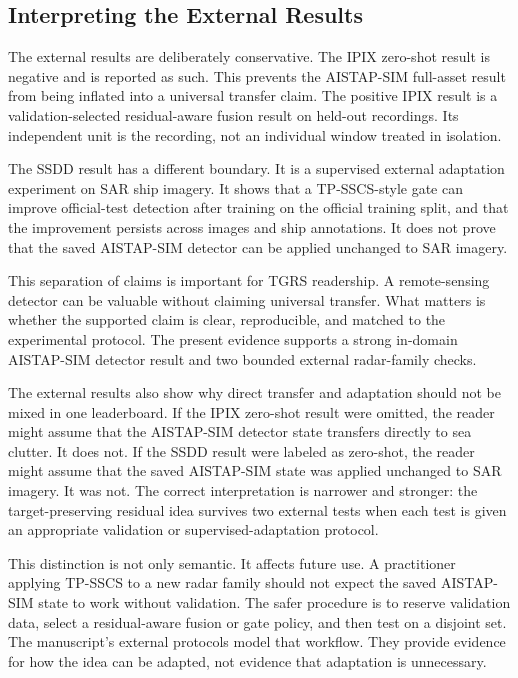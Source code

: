\documentclass[journal]{IEEEtran}
\begin{document}
\subsection{Interpreting the External Results}

The external results are deliberately conservative. The IPIX zero-shot result is negative and is reported as such. This prevents the AISTAP-SIM full-asset result from being inflated into a universal transfer claim. The positive IPIX result is a validation-selected residual-aware fusion result on held-out recordings. Its independent unit is the recording, not an individual window treated in isolation.

The SSDD result has a different boundary. It is a supervised external adaptation experiment on SAR ship imagery. It shows that a TP-SSCS-style gate can improve official-test detection after training on the official training split, and that the improvement persists across images and ship annotations. It does not prove that the saved AISTAP-SIM detector can be applied unchanged to SAR imagery.

This separation of claims is important for TGRS readership. A remote-sensing detector can be valuable without claiming universal transfer. What matters is whether the supported claim is clear, reproducible, and matched to the experimental protocol. The present evidence supports a strong in-domain AISTAP-SIM detector result and two bounded external radar-family checks.

The external results also show why direct transfer and adaptation should not be mixed in one leaderboard. If the IPIX zero-shot result were omitted, the reader might assume that the AISTAP-SIM detector state transfers directly to sea clutter. It does not. If the SSDD result were labeled as zero-shot, the reader might assume that the saved AISTAP-SIM state was applied unchanged to SAR imagery. It was not. The correct interpretation is narrower and stronger: the target-preserving residual idea survives two external tests when each test is given an appropriate validation or supervised-adaptation protocol.

This distinction is not only semantic. It affects future use. A practitioner applying TP-SSCS to a new radar family should not expect the saved AISTAP-SIM state to work without validation. The safer procedure is to reserve validation data, select a residual-aware fusion or gate policy, and then test on a disjoint set. The manuscript's external protocols model that workflow. They provide evidence for how the idea can be adapted, not evidence that adaptation is unnecessary.
\end{document}
